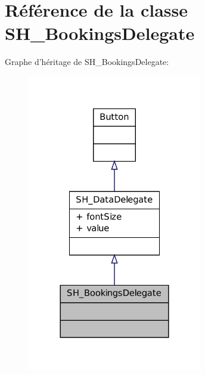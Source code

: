 \hypertarget{classSH__BookingsDelegate}{\section{Référence de la classe S\-H\-\_\-\-Bookings\-Delegate}
\label{classSH__BookingsDelegate}
}


Graphe d'héritage de S\-H\-\_\-\-Bookings\-Delegate\-:\nopagebreak
\begin{figure}[H]
\begin{center}
\leavevmode
\includegraphics[width=216pt]{classSH__BookingsDelegate__inherit__graph}
\end{center}
\end{figure}


